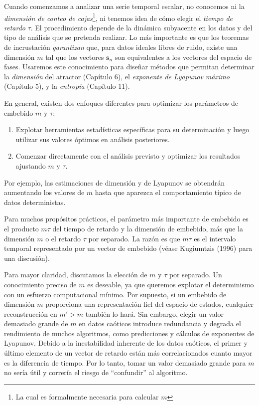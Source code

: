 \documentclass[10pt,a4paper]{book}
\begin{document}
Cuando comenzamos a analizar una serie temporal escalar, no conocemos ni la \textit{dimensión de conteo de cajas}\footnote{La cual es formalmente necesaria para calcular $m$}, ni tenemos idea de cómo elegir el \textit{tiempo de retardo} $\tau$. El procedimiento depende de la dinámica subyacente en los datos y del tipo de análisis que se pretenda realizar. Lo más importante es que los teoremas de incrustación \textit{garantizan} que, para datos ideales libres de ruido, existe una dimensión $m$ tal que los vectores $\mathbf{s}_n$ son equivalentes a los vectores del espacio de fases. Usaremos este conocimiento para diseñar métodos que permitan determinar la \textit{dimensión} del atractor (Capítulo 6), el \textit{exponente de Lyapunov máximo} (Capítulo 5), y la \textit{entropía} (Capítulo 11).

En general, existen dos enfoques diferentes para optimizar los parámetros de embebido $m$ y $\tau$: 
\begin{enumerate}
    \item Explotar herramientas estadísticas específicas para su determinación y luego utilizar sus valores óptimos en análisis posteriores.
    \item Comenzar directamente con el análisis previsto y optimizar los resultados ajustando $m$ y $\tau$.
\end{enumerate}

Por ejemplo, las estimaciones de dimensión y de Lyapunov se obtendrán aumentando los valores de $m$ hasta que aparezca el comportamiento típico de datos deterministas.

Para muchos propósitos prácticos, el parámetro más importante de embebido es el producto $m\tau$ del tiempo de retardo y la dimensión de embebido, más que la dimensión $m$ o el retardo $\tau$ por separado. La razón es que $m\tau$ es el intervalo temporal representado por un vector de embebido (véase Kugiumtzis (1996) para una discusión).

Para mayor claridad, discutamos la elección de $m$ y $\tau$ por separado. Un conocimiento preciso de $m$ es deseable, ya que queremos explotar el determinismo con un esfuerzo computacional mínimo. Por supuesto, si un embebido de dimensión $m$ proporciona una representación fiel del espacio de estados, cualquier reconstrucción en $m' > m$ también lo hará. Sin embargo, elegir un valor demasiado grande de $m$ en datos caóticos introduce redundancia y degrada el rendimiento de muchos algoritmos, como predicciones y cálculos de exponentes de Lyapunov. Debido a la inestabilidad inherente de los datos caóticos, el primer y último elemento de un vector de retardo están más correlacionados cuanto mayor es la diferencia de tiempo. Por lo tanto, tomar un valor demasiado grande para $m$ no sería útil y correría el riesgo de ``confundir'' al algoritmo.
\end{document}
